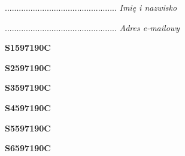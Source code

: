\begin{turn}{90}\begin{minipage}{\linewidth} \vspace{20mm} ................................................  \textit{Imię i nazwisko}\end{minipage}\end{turn}

\begin{turn}{90}\begin{minipage}{\linewidth} \vspace{20mm} ................................................  \textit{Adres e-mailowy}\end{minipage}\end{turn}

\begin{turn}{90}\huge \begin{minipage}{\linewidth} \vspace{10mm}\textbf{S1597190C}\end{minipage}\end{turn}

\begin{turn}{90}\huge \begin{minipage}{\linewidth} \vspace{10mm}\textbf{S2597190C}\end{minipage}\end{turn}

\begin{turn}{90}\huge \begin{minipage}{\linewidth} \vspace{10mm}\textbf{S3597190C}\end{minipage}\end{turn}

\begin{turn}{90}\huge \begin{minipage}{\linewidth} \vspace{10mm}\textbf{S4597190C}\end{minipage}\end{turn}

\begin{turn}{90}\huge \begin{minipage}{\linewidth} \vspace{10mm}\textbf{S5597190C}\end{minipage}\end{turn}

\begin{turn}{90}\huge \begin{minipage}{\linewidth} \vspace{10mm}\textbf{S6597190C}\end{minipage}\end{turn}

